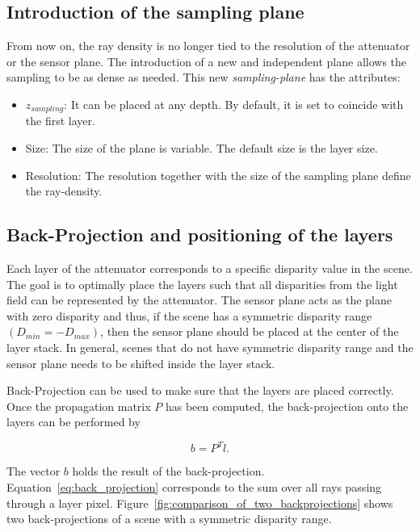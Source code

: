 \documentclass[11pt,a4paper,titlepage]{article}
\begin{document}
\clearpage

\subsection{Introduction of the sampling plane}
From now on, the ray density is no longer tied to the resolution of the attenuator or the sensor plane. The introduction of a new and independent plane allows the sampling to be as dense as needed. This new \emph{sampling-plane} has the attributes:

\begin{itemize}
	\item	$z_{sampling}$: It can be placed at any depth. By default, it is set to coincide with the first layer.
	\item	Size: The size of the plane is variable. The default size is the layer size.
	\item	Resolution: The resolution together with the size of the sampling plane define the ray-density.
\end{itemize}

\subsection{Back-Projection and positioning of the layers}
Each layer of the attenuator corresponds to a specific disparity value in the scene. The goal is to optimally place the layers such that all disparities from the light field can be represented by the attenuator. The sensor plane acts as the plane with zero disparity and thus, if the scene has a symmetric disparity range $\left(D_{min} = -D_{max}\right)$, then the sensor plane should be placed at the center of the layer stack. In general, scenes that do not have symmetric disparity range and the sensor plane needs to be shifted inside the  layer stack. 

Back-Projection can be used to make sure that the layers are placed correctly. Once the propagation matrix $P$ has been computed, the back-projection onto the layers can be performed by

\begin{equation} \label{eq:back_projection}
	b = P^T l.
\end{equation}

The vector $b$ holds the result of the back-projection. Equation~\ref{eq:back_projection} corresponds to the sum over all rays passing through a layer pixel. Figure~\ref{fig:comparison_of_two_backprojections} shows two back-projections of a scene with a symmetric disparity range.
\end{document}
